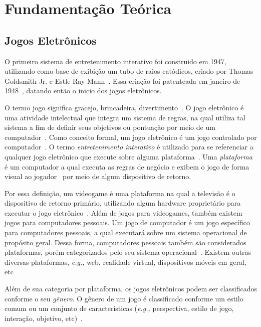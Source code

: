 \chapter{Fundamentação Teórica}
\label{cap2}

\section{Jogos Eletrônicos}

O primeiro sistema de entretenimento interativo foi construido em 1947, utilizando como base de exibição um tubo de raios catódicos, criado por Thomas Goldsmith Jr. e Estle Ray Mann~\cite{Adams2014Jan}.
%
Essa criação foi patenteada em janeiro de 1948~\cite{patents1947Jan}, datando então o inicio dos jogos eletrônicos.



O termo jogo significa gracejo, brincadeira, divertimento~\cite{Adams2014Jan}.
%
O jogo eletrônico é uma atividade intelectual que integra um sistema de regras, na qual utiliza tal sistema a fim de definir seus objetivos ou pontuação por meio de um computador~\cite{video_game_technologies}.
%
Como conceito formal, um jogo eletrônico é um jogo controlado por computador~\cite{Adams2014Jan}.
%
O termo \textit{entretenimento interativo} é utilizado para se referenciar a qualquer jogo eletrônico que execute sobre alguma plataforma~\cite{video_game_technologies}.
%
Uma \textit{plataforma} é um computador a qual executa as regras de negócio e exibem o jogo de forma visual ao jogador~\cite{video_game_technologies} por meio de algum dispositivo de retorno.



Por essa definição, um videogame é uma plataforma na qual a televisão é o dispositivo de retorno primário, utilizando algum hardware proprietário para executar o jogo eletrônico~\cite{video_game_technologies}.
%
Além de jogos para videogames, também existem jogos para computadores pessoais.
%
Um jogo de computador é um jogo específico para computadores pessoais, a qual executará sobre um sistema operacional de propósito geral.
%
Dessa forma, computadores pessoais também são considerados plataformas, porém categorizados pelo seu sistema operacional~\cite{video_game_technologies}.
%
Existem outras diversas plataformas, \textit{e.g.,} web, realidade virtual, dispositivos móveis em geral, etc


Além de sua categoria por plataforma, os jogos eletrônicos podem ser classificados conforme o seu \textit{gênero}.
%
O gênero de um jogo é classificado conforme um estilo comum ou um conjunto de características (\textit{e.g.,} perspectiva, estilo de jogo, interação, objetivo, etc)~\cite{video_game_technologies}.



